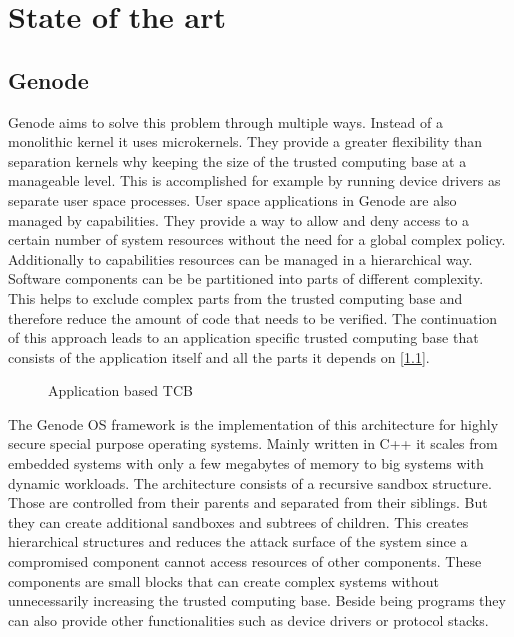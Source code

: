 \documentclass[
a4paper,
12pt,
notitlepage,
parskip=half,
DIV=11,
]{scrbook}
\begin{document}
	\chapter{State of the art}
		
		\section{Genode}
		
		Genode aims to solve this problem through multiple ways.
		Instead of a monolithic kernel it uses microkernels.
		They provide a greater flexibility than separation kernels why keeping the size of the trusted computing base at a manageable level.
		This is accomplished for example by running device drivers as separate user space processes.
		User space applications in Genode are also managed by capabilities.
		They provide a way to allow and deny access to a certain number of system resources without the need for a global complex policy.
		Additionally to capabilities resources can be managed in a hierarchical way.
		Software components can be be partitioned into parts of different complexity.
		This helps to exclude complex parts from the trusted computing base and therefore reduce the amount of code that needs to be verified.
		The continuation of this approach leads to an application specific trusted computing base that consists of the application itself and all the parts it depends on [\ref{fig:tcb_tree}].
		\citep{genode}
		
		\begin{figure}
			\centering
			
			\caption{Application based TCB \citep{genode}}
			\label{fig:tcb_tree}
		\end{figure}
	
		The Genode OS framework is the implementation of this architecture for highly secure special purpose operating systems.
		Mainly written in C++ it scales from embedded systems with only a few megabytes of memory to big systems with dynamic workloads.
		The architecture consists of a recursive sandbox structure.
		Those are controlled from their parents and separated from their siblings.
		But they can create additional sandboxes and subtrees of children.
		This creates hierarchical structures and reduces the attack surface of the system since a compromised component cannot access resources of other components.
		These components are small blocks that can create complex systems without unnecessarily increasing the trusted computing base.
		Beside being programs they can also provide other functionalities such as device drivers or protocol stacks.
		
\end{document}
